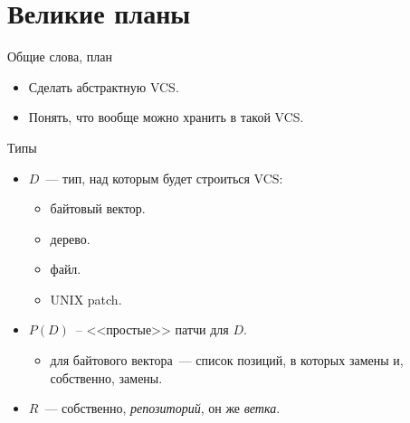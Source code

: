 \section{Великие планы}

\begin{frame}{Общие слова, план}
  \begin{itemize}
  \item Сделать абстрактную VCS.
  \item Понять, что вообще можно хранить в такой VCS.
  \end{itemize}
\end{frame}

\begin{frame}{Типы}
  \begin{itemize}
  \item $D$~--- тип, над которым будет строиться VCS:
    \begin{itemize}
    \item байтовый вектор.
    \item дерево.
    \item файл.
    \item UNIX patch.
    \end{itemize}
  \item $P(D)$~-- <<простые>> патчи для $D$.
    \begin{itemize}
    \item для байтового вектора~--- список позиций, в которых замены
      и, собственно, замены.
    \end{itemize}
  \item $R$~--- собственно, \emph{репозиторий}, он же \emph{ветка}.
  \end{itemize}
\end{frame}

